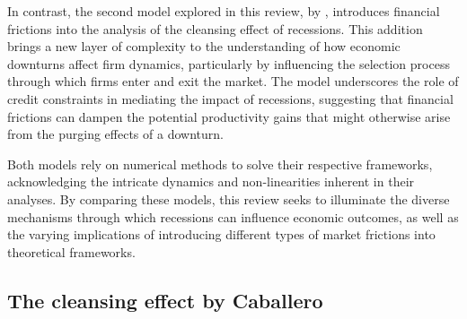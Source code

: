 \documentclass[12pt]{report}
\begin{document}
In contrast, the second model explored in this review, by \cite{OsePap17}, introduces financial frictions into
the analysis of the cleansing effect of recessions. This addition brings a new layer of complexity to the understanding
of how economic downturns affect firm dynamics, particularly by influencing the selection process through which firms
enter and exit the market. The model underscores the role of credit constraints in mediating the impact of recessions,
suggesting that financial frictions can dampen the potential productivity gains that might otherwise arise from the
purging effects of a downturn.

Both models rely on numerical methods to solve their respective frameworks, acknowledging the intricate dynamics and
non-linearities inherent in their analyses. By comparing these models, this review seeks to illuminate the diverse
mechanisms through which recessions can influence economic outcomes, as well as the varying implications of introducing
different types of market frictions into theoretical frameworks.
\subsection{The cleansing effect by Caballero}
\end{document}
